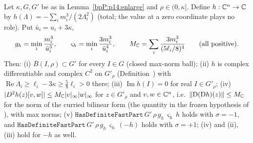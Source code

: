 \begin{lemma}\label{bpP:p14:h-data}
Let $\kappa,G,G'$ be as in Lemma~\ref{bpP:p14:enlarge} and $\rho\in(0,\kappa]$. Define $h:\mathbb{C}^n\to\mathbb{C}$ by $h(\Lambda)=-\sum_im_i^3/(2\Lambda_i^2)$ (total; the value at a zero coordinate plays no role). Put $\bar u_i=u_i+3\kappa$,
\[g_h=\min_i\frac{m_i^3}{\bar u_i^3},\qquad\varsigma_h=\min_i\frac{3m_i^3}{\bar u_i^4},\qquad M_{\mathbb{C}}=\sum_i\frac{3m_i^3}{(5\ell_i/8)^4}\qquad(\text{all positive}).\]
Then: (i) $\overline B(I,\rho)\subset G'$ for every $I\in G$ (closed max-norm ball); (ii) $h$ is complex differentiable and complex $C^2$ on $G'_\rho$ (Definition~) with $\operatorname{Re}\Lambda_i\ge\ell_i-3\kappa\ge\frac58\ell_i>0$ there; (iii) $\operatorname{Im}h(I)=0$ for real $I\in G'_\rho$; (iv) $\lvert D^2h(z)[v,w]\rvert\le M_{\mathbb{C}}\lvert v\rvert_\infty\lvert w\rvert_\infty$ for $z\in G'_\rho$ and $v,w\in\mathbb{C}^n$, i.e.\ $\lVert \mathrm D(\mathrm Dh)(z)\rVert\le M_{\mathbb{C}}$ for the norm of the curried bilinear form (the quantity in the frozen hypothesis of ), with max norms;
(v) $\texttt{HasDefiniteFastPart}\,G'\,\rho\,g_h\,\varsigma_h\,h$ holds with $\sigma=-1$, and $\texttt{HasDefiniteFastPart}\,G'\,\rho\,g_h\,\varsigma_h\,(-h)$ holds with $\sigma=+1$; (iv) and (ii), (iii) hold for $-h$ as well.
\end{lemma}
